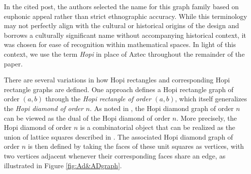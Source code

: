 \documentclass[11pt]{article}
\theoremstyle{plain} \newtheorem{question}{Question}
\theoremstyle{definition}
\begin{document}

In the cited post, the authors selected the name for this graph family based on euphonic appeal rather than strict ethnographic accuracy. While this terminology may not perfectly align with the cultural or historical origins of the design and borrows a culturally significant name without accompanying historical context, it was chosen for ease of recognition within mathematical spaces. In light of this context, we use the term \textit{Hopi} in place of Aztec throughout the remainder of the paper.

\quad \quad There are several variations in how Hopi rectangles and corresponding Hopi rectangle graphs are defined. One approach defines a Hopi rectangle graph of order $(a,b)$ through the \textit{Hopi rectangle of order $(a,b)$}, which itself generalizes the \textit{Hopi diamond of order $n$}. As noted in \cite{SPARSEMatching}, the Hopi diamond graph of order $n$ can be viewed as the dual of the Hopi diamond of order $n$. More precisely, the Hopi diamond of order $n$ is a combinatorial object that can be realized as the union of lattice squares described in \cite{FirstMentionAD}. The associated Hopi diamond graph of order $n$ is then defined by taking the faces of these unit squares as vertices, with two vertices adjacent whenever their corresponding faces share an edge, as illustrated in Figure \ref{fig:Ad&ADgraph}.
\end{document}

